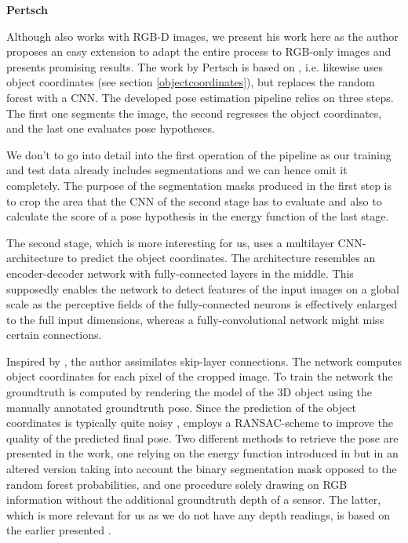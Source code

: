 \quad \textbf{Pertsch}

Although \cite{pertsch} also works with RGB-D images, we present his work here as the author proposes an easy extension to adapt the entire process to RGB-only images and presents promising results. The work by Pertsch is based on \cite{brachmann1}, i.e. likewise uses object coordinates  (see section \ref{objectcoordinates}), but replaces the random forest with a CNN. The developed pose estimation pipeline relies on three steps. The first one segments the image, the second regresses the object coordinates, and the last one evaluates pose hypotheses. 

We don't to go into detail into the first operation of the pipeline as our training and test data already includes segmentations and we can hence omit it completely. The purpose of the segmentation masks produced in the first step is to crop the area that the CNN of the second stage has to evaluate and also to calculate the score of a pose hypothesis in the energy function of the last stage. 

The second stage, which is more interesting for us, uses a multilayer CNN-architecture to predict the object coordinates. The architecture resembles an encoder-decoder network with fully-connected layers in the middle. This supposedly enables the network to detect features of the input images on a global scale as the perceptive fields of the fully-connected neurons is effectively enlarged to the full input dimensions, whereas a fully-convolutional network might miss certain connections. 

Inspired by \cite{oronneberger}, the author assimilates skip-layer connections. The network computes object coordinates for each pixel of the cropped image. To train the network the groundtruth is computed by rendering the model of the 3D object using the manually annotated groundtruth pose. Since the prediction of the object coordinates is typically quite noisy \cite{bb8}, \cite{pertsch} employs a RANSAC-scheme to improve the quality of the predicted final pose. Two different methods to retrieve the pose are presented in the work, one relying on the energy function introduced in \cite{brachmann1} but in an altered version taking into account the binary segmentation mask opposed to the random forest probabilities, and one procedure solely drawing on RGB information without the additional groundtruth depth of a sensor. The latter, which is more relevant for us as we do not have any depth readings, is based on the earlier presented \cite{brachmann2}. 

